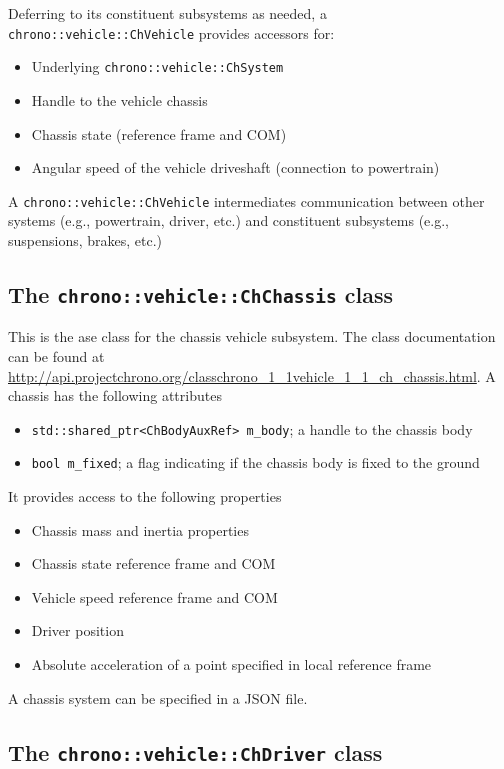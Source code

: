 Deferring to its constituent subsystems as needed, a \lstinline{chrono::vehicle::ChVehicle} provides accessors for:

\begin{itemize}
\item Underlying \lstinline{chrono::vehicle::ChSystem}
\item Handle to the vehicle chassis
\item Chassis state (reference frame and COM)
\item Angular speed of the vehicle driveshaft (connection to powertrain)
\end{itemize}

A \lstinline{chrono::vehicle::ChVehicle} intermediates communication between other systems (e.g.,
powertrain, driver, etc.) and constituent subsystems (e.g., suspensions, brakes, etc.)

\subsection{ The \lstinline{chrono::vehicle::ChChassis} class}

This is the ase class for the chassis vehicle subsystem. The class documentation can be found at 
\url{http://api.projectchrono.org/classchrono_1_1vehicle_1_1_ch_chassis.html}. A chassis has the following attributes

\begin{itemize}
\item \lstinline{std::shared_ptr<ChBodyAuxRef> m_body}; a handle to the chassis body
\item \lstinline{bool m_fixed}; a flag indicating if the chassis body is fixed to the ground
\end{itemize}

It provides access to the following properties

\begin{itemize}
\item Chassis mass and inertia properties
\item Chassis state reference frame and COM
\item Vehicle speed reference frame and COM
\item Driver position
\item Absolute acceleration of a point specified in local reference frame
\end{itemize}

A chassis system can be specified in a JSON file.

\subsection{ The \lstinline{chrono::vehicle::ChDriver} class}

